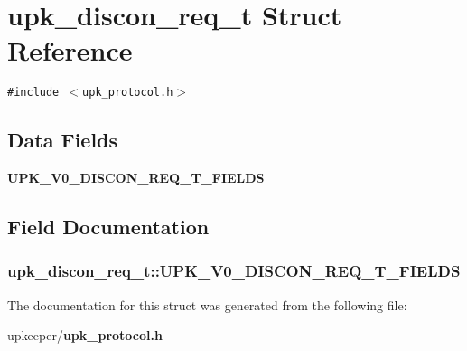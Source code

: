 \section{upk\_\-discon\_\-req\_\-t Struct Reference}
\label{structupk__discon__req__t}
{\tt \#include $<$upk\_\-protocol.h$>$}

\subsection*{Data Fields}
\begin{CompactItemize}
\item 
\bf{UPK\_\-V0\_\-DISCON\_\-REQ\_\-T\_\-FIELDS}
\end{CompactItemize}


\subsection{Field Documentation}
\subsubsection{\setlength{\rightskip}{0pt plus 5cm}\bf{upk\_\-discon\_\-req\_\-t::UPK\_\-V0\_\-DISCON\_\-REQ\_\-T\_\-FIELDS}}\label{structupk__discon__req__t_977caa7f17d39569f6d6033b8d46f316}




The documentation for this struct was generated from the following file:\begin{CompactItemize}
\item 
upkeeper/\bf{upk\_\-protocol.h}\end{CompactItemize}
